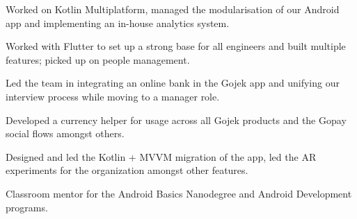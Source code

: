 \documentclass[]{deedy-resume-reversed}
\begin{document}
\begin{minipage}[t]{0.60\textwidth}

\textbullet{}
\begin{tightemize}
\item Worked on Kotlin Multiplatform, managed the modularisation of our Android app and implementing an in-house analytics system.
\end{tightemize}

\textbullet{}
\begin{tightemize}
\item Worked with Flutter to set up a strong base for all engineers and built multiple features; picked up on people management.
\end{tightemize}

\textbullet{}
\begin{tightemize}
\item Led the team in integrating an online bank in the Gojek app and unifying our interview process while moving to a manager role.
\end{tightemize}

\textbullet{}
\begin{tightemize}
\item Developed a currency helper for usage across all Gojek products and the Gopay social flows amongst others.
\end{tightemize}
\sectionsep


\textbullet{}
\begin{tightemize}
\item Designed and led the Kotlin + MVVM migration of the app, led the AR experiments for the organization amongst other features.
\end{tightemize}
\sectionsep


\textbullet{}
\begin{tightemize}
\item Classroom mentor for the Android Basics Nanodegree and Android Development programs.
\end{tightemize}
\sectionsep


\end{minipage}
\end{document}
